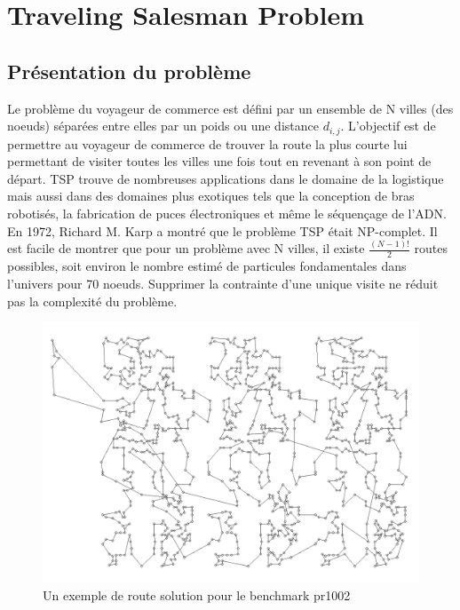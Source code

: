 \documentclass{article}%
\begin{document}
\clearpage


\section{Traveling Salesman Problem}

\subsection{Présentation du problème}

Le problème du voyageur de commerce est défini par un ensemble de N villes (des noeuds) séparées entre elles par un poids ou une distance $ d_{i,j} $.
L'objectif est de permettre au voyageur de commerce de trouver la route la plus courte lui permettant de visiter toutes les villes une fois tout en revenant à son point de départ. TSP trouve de nombreuses applications dans le domaine de la logistique mais aussi dans des domaines plus exotiques tels que la conception de bras robotisés, la fabrication de puces électroniques et même le séquençage de l'ADN.
	En 1972, Richard M. Karp a montré que le problème TSP était NP-complet. Il est facile de montrer que pour un problème avec N villes, il existe $ \frac{(N-1)!}{2} $ routes possibles, soit environ le nombre estimé de particules fondamentales dans l'univers pour 70 noeuds. Supprimer la contrainte d'une unique visite ne réduit pas la complexité du problème. 

\begin{figure}[h]
\begin{center}
\includegraphics[scale=0.4]{pr1002.png} 
\caption{Un exemple de route solution pour le benchmark pr1002}
\end{center}
\end{figure}
\end{document}
